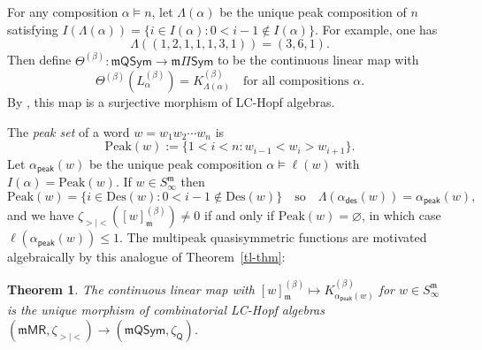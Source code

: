 \documentclass[11pt]{article}
\newtheorem{theorem}[theo]{Theorem}
\theoremstyle{definition}
\numberwithin{equation}{section}
\numberwithin{equation}{section}
\newcommand{\fk}{\mathfrak}
\newcommand{\be}{\begin{equation}}
\newcommand{\ee}{\end{equation}}
\newcommand{\Des}{\mathrm{Des}}
\newcommand{\zetaq}{\zeta_{\mathsf{Q}}}
\newcommand{\Sym}{\mathsf{Sym}}
\newcommand{\QSymQ}{\Pi\Sym}
\newcommand{\mQSymQ}{\mathfrak{m}\QSymQ}
\newcommand{\mMPR}{\mathfrak{m}\mathsf{MR}}
\newcommand{\ttheta}{\Theta^{(\beta)}}
\newcommand{\mQSym}{\mathfrak{m}\mathsf{QSym}}
\newcommand{\Sm}{S^{\fk m}}
\newcommand{\m}{\mathfrak{m}}
\newcommand{\PeakSet}{\mathrm{Peak}}
\newcommand{\cC}{\alpha_{\mathsf{des}}}
\newcommand{\cD}{\alpha_{\mathsf{peak}}}
\newcommand{\defn}[1]{{\color{darkred}\emph{#1}}}
\begin{document}
For any composition $\alpha\vDash n$, let $\Lambda(\alpha)$ be the 
unique peak composition of $n$ satisfying $ I(\Lambda(\alpha)) = \{ i \in I(\alpha) : 0 < i-1 \notin I(\alpha)\}.$
For example, one has \[\Lambda((1,2,1,1,1,3,1)) = (3,6,1).\] 
Then define
$\ttheta : \mQSym \to \mQSymQ$
to
be the continuous linear map with 
\be\label{ttheta-eq} 
\ttheta(L^{(\beta)}_\alpha) = K^{(\beta)}_{\Lambda(\alpha)}
\quad\text{for all compositions $\alpha$.}
\ee
By \cite[Cor.~4.22]{LM2019},
this map is a surjective morphism of LC-Hopf algebras.

The \defn{peak set} of a word $w=w_1w_2\cdots w_n$ is 
\[\PeakSet(w) := \{1<i<n : w_{i-1} < w_i > w_{i+1}\}.\]
Let $\cD(w)$ be the unique peak composition $\alpha\vDash\ell(w)$ with $I(\alpha) = \PeakSet(w)$.
If $w \in \Sm_\infty$ then 
\be\label{peakset-eq}
\PeakSet(w) = \{ i \in \Des(w) : 0 < i-1 \notin \Des(w)\}\quad\text{so}\quad 
\Lambda(\cC(w))=   \cD(w),\ee
and we have
$ \zeta_{>|<}([w]^{(\beta)}_\m) \neq 0$ if and only if $\PeakSet(w) = \varnothing$, in which case $\ell(\cD(w))\leq 1$.
The multipeak quasisymmetric functions are motivated algebraically by this analogue of Theorem~\ref{tl-thm}:


\begin{theorem}\label{peak-tl-thm}
The continuous linear map with $[w]^{(\beta)}_\m \mapsto K^{(\beta)}_{\cD(w)}$ for $w \in \Sm_\infty$
is the unique morphism of 
combinatorial LC-Hopf algebras 
$(\mMPR,\zeta_{>|<}) \to (\mQSym, \zetaq)$.
\end{theorem}
\end{document}
